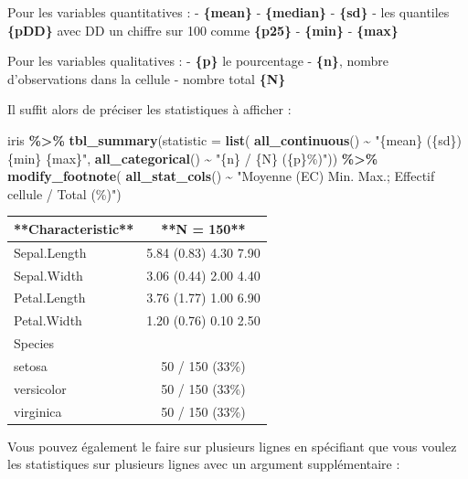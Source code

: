 \documentclass[
]{book}
\newenvironment{Shaded}{\begin{snugshade}}{\end{snugshade}}
\newcommand{\AttributeTok}[1]{\textcolor[rgb]{0.13,0.29,0.53}{#1}}
\newcommand{\FunctionTok}[1]{\textcolor[rgb]{0.13,0.29,0.53}{\textbf{#1}}}
\newcommand{\NormalTok}[1]{#1}
\newcommand{\SpecialCharTok}[1]{\textcolor[rgb]{0.81,0.36,0.00}{\textbf{#1}}}
\newcommand{\StringTok}[1]{\textcolor[rgb]{0.31,0.60,0.02}{#1}}
\begin{document}
Pour les variables quantitatives :
- \textbf{\{mean\}}
- \textbf{\{median\}}
- \textbf{\{sd\}}
- les quantiles \textbf{\{pDD\}} avec DD un chiffre sur 100 comme \textbf{\{p25\}}
- \textbf{\{min\}}
- \textbf{\{max\}}

Pour les variables qualitatives :
- \textbf{\{p\}} le pourcentage
- \textbf{\{n\}}, nombre d'observations dans la cellule
- nombre total \textbf{\{N\}}

Il suffit alors de préciser les statistiques à afficher :

\begin{Shaded}
\begin{Highlighting}[]
\NormalTok{iris }\SpecialCharTok{\%\textgreater{}\%} \FunctionTok{tbl\_summary}\NormalTok{(}\AttributeTok{statistic =} \FunctionTok{list}\NormalTok{(}
  \FunctionTok{all\_continuous}\NormalTok{() }\SpecialCharTok{\textasciitilde{}} \StringTok{"\{mean\} (\{sd\}) \{min\} \{max\}"}\NormalTok{,}
  \FunctionTok{all\_categorical}\NormalTok{() }\SpecialCharTok{\textasciitilde{}} \StringTok{"\{n\} / \{N\} (\{p\}\%)"}\NormalTok{)) }\SpecialCharTok{\%\textgreater{}\%}
  \FunctionTok{modify\_footnote}\NormalTok{( }\FunctionTok{all\_stat\_cols}\NormalTok{() }\SpecialCharTok{\textasciitilde{}} \StringTok{"Moyenne (EC) Min. Max.; Effectif cellule / Total (\%)"}\NormalTok{)}
\end{Highlighting}
\end{Shaded}

\begin{tabular}{l|c}
\hline
**Characteristic** & **N = 150**\\
\hline
Sepal.Length & 5.84 (0.83) 4.30 7.90\\
\hline
Sepal.Width & 3.06 (0.44) 2.00 4.40\\
\hline
Petal.Length & 3.76 (1.77) 1.00 6.90\\
\hline
Petal.Width & 1.20 (0.76) 0.10 2.50\\
\hline
Species & \\
\hline
setosa & 50 / 150 (33\%)\\
\hline
versicolor & 50 / 150 (33\%)\\
\hline
virginica & 50 / 150 (33\%)\\
\hline
\end{tabular}

Vous pouvez également le faire sur plusieurs lignes en spécifiant que vous voulez
les statistiques sur plusieurs lignes avec un argument supplémentaire :
\end{document}
